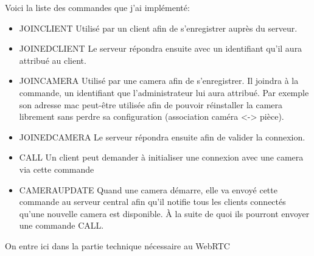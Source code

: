 \documentclass[12pt, a4paper]{report}
\begin{document}
Voici la liste des commandes que j'ai implémenté:\newline
\begin{itemize}
    \item JOIN\textunderscore CLIENT\newline
        Utilisé par un client afin de s'enregistrer auprès du serveur.\newline

    \item JOINED\textunderscore CLIENT\newline
        Le serveur répondra ensuite avec un identifiant qu'il aura attribué au client.\newline

    \item JOIN\textunderscore CAMERA\newline
        Utilisé par une camera afin de s'enregistrer.
        Il joindra à la commande, un identifiant que l'administrateur lui aura attribué.
        Par exemple son adresse mac peut-être utilisée afin de pouvoir réinstaller la camera librement sans perdre sa configuration (association caméra <-> pièce).\newline

    \item JOINED\textunderscore CAMERA\newline
        Le serveur répondra ensuite afin de valider la connexion.\newline

    \item CALL\newline
        Un client peut demander à initialiser une connexion avec une camera via cette commande\newline

    \item CAMERA\textunderscore UPDATE\newline
        Quand une camera démarre, elle va envoyé cette commande au serveur central afin qu'il notifie tous les clients connectés qu'une nouvelle camera est disponible. À la suite de quoi ils pourront envoyer une commande CALL.\newline
\end{itemize}
\newpage
On entre ici dans la partie technique nécessaire au WebRTC\newline
\end{document}
